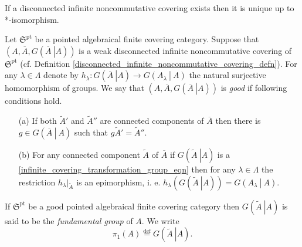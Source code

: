 \documentclass{beamer}
\theoremstyle{plain}
\newcommand{\la}{\lambda}
\newcommand{\La}{\Lambda}
\newcommand{\bydef}{\stackrel{\mathrm{def}}{=}}
\begin{document}
\begin{frame}
\begin{lemma}\label{uni_dicsonnected_lem}
	If a disconnected infinite noncommutative covering exists then it is unique up to *-isomorphism. 
\end{lemma}

\begin{definition}\label{good_defn}
	Let	$\mathfrak{S}^{\mathrm{pt}}$ be a pointed algebraical  finite covering category.   Suppose that $\left(A, \overline{A}, G\left(\left.\overline{A}~\right| A\right)\right)$ is a weak disconnected infinite noncommutative covering of $\mathfrak{S}^{\mathrm{pt}}$ (cf. Definition \ref{disconnected_infinite_noncommutative_covering_defn}). For any $\la \in \La$ denote by $h_\la: G\left(\left.\overline{A}~\right| A\right) \to G\left(\left. A_\la~\right|~A \right)$ the natural surjective homomorphism of groups.
	We say  that $\left(A, \overline{A}, G\left(\left.\overline{A}~\right| A\right)\right)$  is \textit{good} if  following conditions hold.
	\begin{enumerate}
		\item[(a)] If both $\widetilde{A}'$ and $\widetilde{A}''$ are  {connected components} of $\overline A$ then there is  $g \in G\left(\left.\overline{A}~\right|~ A\right)$ such that $g \widetilde{A}'= \widetilde{A}''$.
		\item [(b)] For any connected component $\widetilde A$ of $\overline{A}$ if  $G\left(\left.\widetilde{A}~\right| A\right)$ is a \eqref{infinite_covering_transformation_group_eqn} then for any $\la \in \La$ the restriction $h_\la|_{\widetilde A}$ is an epimorphism, i. e. $h_\la\left(G\left(\left.\widetilde{A}~\right| A\right) \right) = G\left(\left. A_\la~\right|~A \right)$.
	\end{enumerate}
\end{definition}

\end{frame}
\begin{frame}
	\begin{definition}
	If 	$\mathfrak{S}^{\mathrm{pt}}$ be a good pointed algebraical  finite covering category then $G\left(\left.\widetilde{A}~\right| A\right)$ is said to be the \textit{fundamental group} of $A$. We write
	$$
\pi_1\left(A \right) \bydef G\left(\left.\widetilde{A}~\right| A\right).	
	$$
	\end{definition}
\end{frame}
\end{document}
